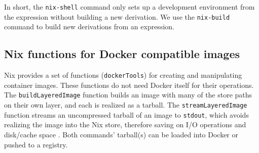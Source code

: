 In short, the \verb|nix-shell| command only sets up a development environment from the expression without building a new derivation. We use the \verb|nix-build| command to build new derivations from an expression. 

\subsection{Nix functions for Docker compatible images}\label{nix-dockertools}
Nix provides a set of functions (\verb|dockerTools|) for creating and manipulating container images. These functions do not need Docker itself for their operations. %
The \verb|buildLayeredImage| function builds an image with many of the store paths on their own layer, and each is realized as a tarball. The \verb|streamLayeredImage| function streams an uncompressed tarball of an image to \verb|stdout|, which avoids realizing the image into the Nix store, therefore saving on I/O operations and disk/cache space \cite{DockerTools}. Both commands' tarball(s) can be loaded into Docker or pushed to a registry.